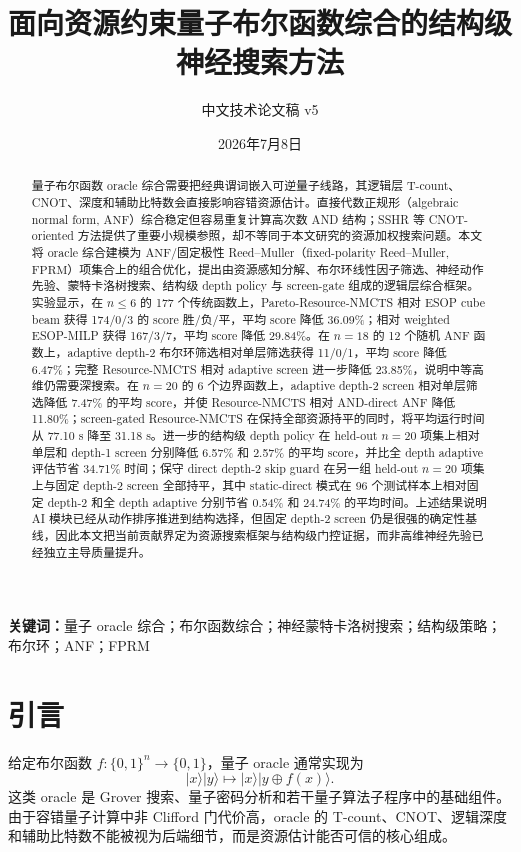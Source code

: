 \documentclass[UTF8,fontset=macnew,11pt]{ctexart}
\title{面向资源约束量子布尔函数综合的结构级神经搜索方法}
\author{中文技术论文稿 v5}
\date{2026年7月8日}
\newcommand{\method}{Resource-NMCTS}
\newcommand{\pareto}{Pareto-Resource-NMCTS}
\newcommand{\anf}{\ensuremath{\mathrm{ANF}}}
\newcommand{\fprm}{\ensuremath{\mathrm{FPRM}}}
\begin{document}
\pagestyle{plain}
\maketitle

\begin{abstract}
量子布尔函数 oracle 综合需要把经典谓词嵌入可逆量子线路，其逻辑层 T-count、CNOT、深度和辅助比特数会直接影响容错资源估计。直接代数正规形（algebraic normal form, \anf{}）综合稳定但容易重复计算高次数 AND 结构；SSHR 等 CNOT-oriented 方法提供了重要小规模参照，却不等同于本文研究的资源加权搜索问题。本文将 oracle 综合建模为 \anf{}/固定极性 Reed--Muller（fixed-polarity Reed--Muller, \fprm{}）项集合上的组合优化，提出由资源感知分解、布尔环线性因子筛选、神经动作先验、蒙特卡洛树搜索、结构级 depth policy 与 screen-gate 组成的逻辑层综合框架。实验显示，在 $n\leq6$ 的 177 个传统函数上，\pareto{} 相对 ESOP cube beam 获得 174/0/3 的 score 胜/负/平，平均 score 降低 36.09\%；相对 weighted ESOP-MILP 获得 167/3/7，平均 score 降低 29.84\%。在 $n=18$ 的 12 个随机 \anf{} 函数上，adaptive depth-2 布尔环筛选相对单层筛选获得 11/0/1，平均 score 降低 6.47\%；完整 \method{} 相对 adaptive screen 进一步降低 23.85\%，说明中等高维仍需要深搜索。在 $n=20$ 的 6 个边界函数上，adaptive depth-2 screen 相对单层筛选降低 7.47\% 的平均 score，并使 \method{} 相对 AND-direct ANF 降低 11.80\%；screen-gated \method{} 在保持全部资源持平的同时，将平均运行时间从 77.10 s 降至 31.18 s。进一步的结构级 depth policy 在 held-out $n=20$ 项集上相对单层和 depth-1 screen 分别降低 6.57\% 和 2.57\% 的平均 score，并比全 depth adaptive 评估节省 34.71\% 时间；保守 direct depth-2 skip guard 在另一组 held-out $n=20$ 项集上与固定 depth-2 screen 全部持平，其中 static-direct 模式在 96 个测试样本上相对固定 depth-2 和全 depth adaptive 分别节省 0.54\% 和 24.74\% 的平均时间。上述结果说明 AI 模块已经从动作排序推进到结构选择，但固定 depth-2 screen 仍是很强的确定性基线，因此本文把当前贡献界定为资源搜索框架与结构级门控证据，而非高维神经先验已经独立主导质量提升。
\end{abstract}

\noindent\textbf{关键词：}量子 oracle 综合；布尔函数综合；神经蒙特卡洛树搜索；结构级策略；布尔环；ANF；FPRM

\section{引言}

给定布尔函数 $f:\{0,1\}^n\rightarrow\{0,1\}$，量子 oracle 通常实现为
\begin{equation}
  |x\rangle |y\rangle \mapsto |x\rangle |y\oplus f(x)\rangle .
  \label{eq:oracle}
\end{equation}
这类 oracle 是 Grover 搜索、量子密码分析和若干量子算法子程序中的基础组件。由于容错量子计算中非 Clifford 门代价高，oracle 的 T-count、CNOT、逻辑深度和辅助比特数不能被视为后端细节，而是资源估计能否可信的核心组成。
\end{document}
